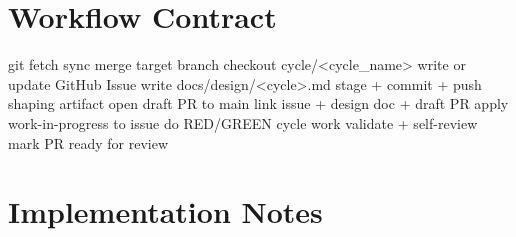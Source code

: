\section{Workflow Contract}\label{record-208-workflow-contract}

\begin{CodeBlock}
git fetch
sync merge target branch
checkout cycle/<cycle_name>
write or update GitHub Issue
write docs/design/<cycle>.md
stage + commit + push shaping artifact
open draft PR to main
link issue + design doc + draft PR
apply work-in-progress to issue
do RED/GREEN cycle work
validate + self-review
mark PR ready for review
\end{CodeBlock}

\section{Implementation Notes}\label{record-208-implementation-notes}

